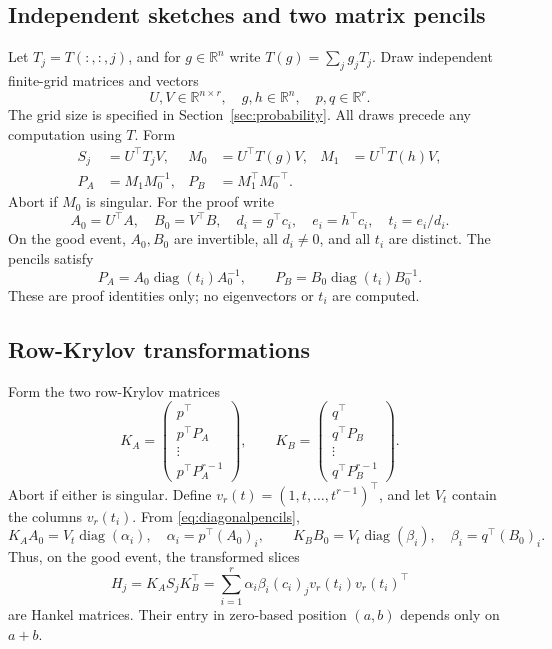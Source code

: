\documentclass[11pt]{article}
\theoremstyle{remark}\newtheorem{remark}[theorem]{Remark}
\newcommand{\R}{\mathbb R}
\newcommand{\diag}{\operatorname{diag}}
\begin{document}
\subsection{Independent sketches and two matrix pencils}
Let $T_j=T(:,:,j)$, and for $g\in\R^n$ write $T(g)=\sum_j g_jT_j$. Draw independent finite-grid matrices and vectors
\[
 U,V\in\R^{n\times r},\quad g,h\in\R^n,\quad p,q\in\R^r.
\]
The grid size is specified in Section~\ref{sec:probability}. All draws precede any computation using $T$. Form
\begin{align}
 S_j&=U^\top T_jV,&
 M_0&=U^\top T(g)V,& M_1&=U^\top T(h)V,\label{eq:compress}\\
 P_A&=M_1M_0^{-1},& P_B&=M_1^\top M_0^{-\top}.\label{eq:pencils}
\end{align}
Abort if $M_0$ is singular. For the proof write
\[
 A_0=U^\top A,\quad B_0=V^\top B,\quad
 d_i=g^\top c_i,\quad e_i=h^\top c_i,\quad t_i=e_i/d_i.
\]
On the good event, $A_0,B_0$ are invertible, all $d_i\ne0$, and all $t_i$ are distinct. The pencils satisfy
\begin{equation}\label{eq:diagonalpencils}
 P_A=A_0\diag(t_i)A_0^{-1},\qquad
 P_B=B_0\diag(t_i)B_0^{-1}.
\end{equation}
These are proof identities only; no eigenvectors or $t_i$ are computed.

\subsection{Row-Krylov transformations}
Form the two row-Krylov matrices
\begin{equation}\label{eq:krylov}
 K_A=\begin{pmatrix}p^\top\\p^\top P_A\\ \vdots\\p^\top P_A^{r-1}\end{pmatrix},
 \qquad
 K_B=\begin{pmatrix}q^\top\\q^\top P_B\\ \vdots\\q^\top P_B^{r-1}\end{pmatrix}.
\end{equation}
Abort if either is singular. Define $v_r(t)=(1,t,\ldots,t^{r-1})^\top$, and let $V_t$ contain the columns $v_r(t_i)$. From \eqref{eq:diagonalpencils},
\begin{equation}\label{eq:krylovvandermonde}
 K_AA_0=V_t\diag(\alpha_i),\quad \alpha_i=p^\top(A_0)_i,
 \qquad
 K_BB_0=V_t\diag(\beta_i),\quad \beta_i=q^\top(B_0)_i.
\end{equation}
Thus, on the good event, the transformed slices
\begin{equation}\label{eq:hankel}
 H_j=K_AS_jK_B^\top
 =\sum_{i=1}^r\alpha_i\beta_i(c_i)_j v_r(t_i)v_r(t_i)^\top
\end{equation}
are Hankel matrices. Their entry in zero-based position $(a,b)$ depends only on $a+b$.
\end{document}
